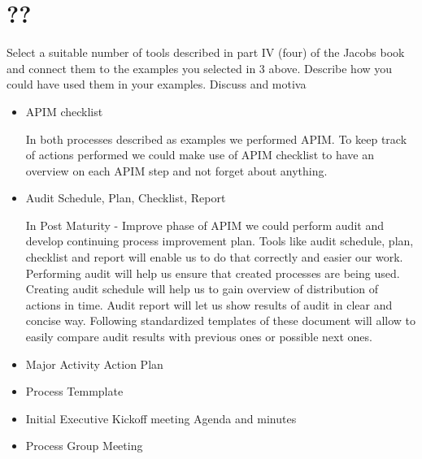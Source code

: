 
\section{??}
Select a suitable number of tools described in part IV (four) of the Jacobs book and connect them to the examples you selected in 3 above. Describe how you could have used them in your examples. Discuss and motiva

\begin{itemize}
\item APIM checklist

	In both processes described as examples we performed APIM. To keep track of actions performed we could make use of APIM checklist to have an overview on each APIM step and not forget about anything.

\item Audit Schedule, Plan, Checklist, Report

	In Post Maturity - Improve phase of APIM we could perform audit and develop continuing process improvement plan. Tools like audit schedule, plan, checklist and report will enable us to do that correctly and easier our work. Performing audit will help us ensure that created processes are being used. Creating audit schedule will help us to gain overview of distribution of actions in time. Audit report will let us show results of audit in clear and concise way. Following standardized templates of these document will allow to easily compare audit results with previous ones or possible next ones.

\item Major Activity Action Plan
\item Process Temmplate
\item Initial Executive Kickoff meeting Agenda and minutes
\item Process Group Meeting 
\end{itemize}

